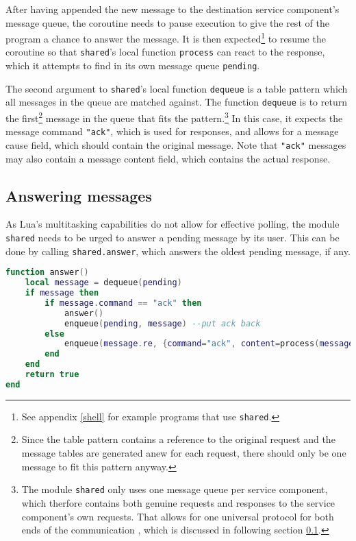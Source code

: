 After having appended the new message to the destination service component's message queue, the coroutine needs to pause execution to give the rest of the program a chance to answer the message. It is then expected\footnote{See appendix \ref{shell} for example programs that use \texttt{shared}.} to resume the coroutine so that \texttt{shared}'s local function \texttt{process} can react to the response, which it attempts to find in its own message queue \texttt{pending}.

The second argument to \texttt{shared}'s local function \texttt{dequeue} is a table pattern which all messages in the queue are matched against. The function \texttt{dequeue} is to return the first\footnote{Since the table pattern contains a reference to the original request and the message tables are generated anew for each request, there should only be one message to fit this pattern anyway.} message in the queue that fits the pattern.\footnote{The module \texttt{shared} only uses one message queue per service component, which therfore contains both genuine requests and responses to the service component's own requests. That allows for one universal protocol for both ends of the communication , which is discussed in following section \ref{sec:messaging:answering}.} In this case, it expects the message command \texttt{"ack"}, which is used for responses, and allows for a message cause field, which should contain the original message. Note that \texttt{"ack"} messages may also contain a message content field, which contains the actual response.

\subsection{Answering messages}
\label{sec:messaging:answering}

As Lua's multitasking capabilities do not allow for effective polling, the module \texttt{shared} needs to be urged to answer a pending message by its user. This can be done by calling \texttt{shared.answer}, which answers the oldest pending message, if any.

\begin{lstlisting}[language=lua, caption={The function \texttt{answer} of the module \texttt{shared}}, label=lst:sharedanswer, name=lst:sharedanswer]
function answer()
	local message = dequeue(pending)
	if message then
		if message.command == "ack" then
			answer()
			enqueue(pending, message) --put ack back
		else
			enqueue(message.re, {command="ack", content=process(message), cause=message})
		end
	end
	return true
end
\end{lstlisting}

